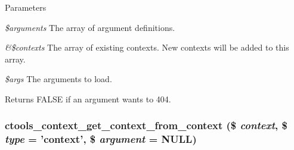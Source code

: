 \begin{DoxyParams}{Parameters}
\item[{\em \$arguments}]The array of argument definitions. \item[{\em \&\$contexts}]The array of existing contexts. New contexts will be added to this array. \item[{\em \$args}]The arguments to load.\end{DoxyParams}
\begin{DoxyReturn}{Returns}
FALSE if an argument wants to 404. 
\end{DoxyReturn}
\hypertarget{context_8inc_a320bbcf9d3bfbdded99116ceab3feb57}{
\subsubsection[{ctools\_\-context\_\-get\_\-context\_\-from\_\-context}]{\setlength{\rightskip}{0pt plus 5cm}ctools\_\-context\_\-get\_\-context\_\-from\_\-context (\$ {\em context}, \/  \$ {\em type} = {\ttfamily 'context'}, \/  \$ {\em argument} = {\ttfamily NULL})}}
\label{context_8inc_a320bbcf9d3bfbdded99116ceab3feb57}

